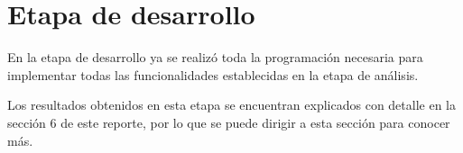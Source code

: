 \section{Etapa de desarrollo}
En la etapa de desarrollo ya se realizó toda la programación necesaria para implementar todas las funcionalidades establecidas en la etapa de análisis.

Los resultados obtenidos en esta etapa se encuentran explicados con detalle en la sección 6 de este reporte, por lo que se puede dirigir a esta sección para conocer más.